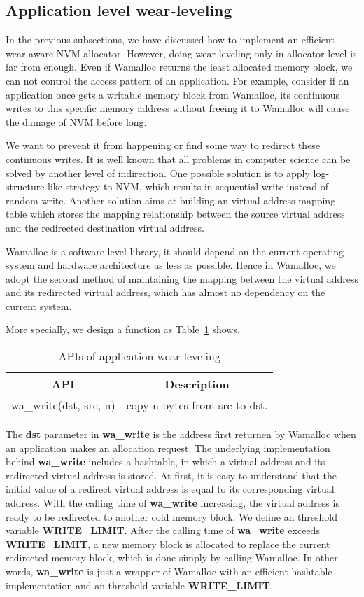 \documentclass{vldb}
\begin{document}
\subsection{Application level wear-leveling}

In the previous subsections, we have discussed how to implement an efficient wear-aware NVM allocator.
However, doing wear-leveling only in allocator level is far from enough.
Even if Wamalloc returns the least allocated memory block, we can not control the access pattern of an application.  
For example, consider if an application once gets a writable memory block from Wamalloc,
its continuous writes to this specific memory address without freeing it to Wamalloc will cause the damage of NVM before long.

We want to prevent it from happening or find some way to redirect these continuous writes.
It is well known that all problems in computer science can be solved by another level of indirection.
One possible solution is to apply log-structure like strategy\cite{rumble2014log} to NVM, 
which results in sequential write instead of random write.
Another solution aims at building an virtual address mapping table which stores the mapping relationship between the source virtual address and the redirected destination virtual address\cite{shao2012ptl}.

Wamalloc is a software level library, it should depend on the current operating system and hardware architecture as less as possible.
Hence in Wamalloc, we adopt the second method of maintaining the mapping between the virtual address and its redirected virtual address,
which has almost no dependency on the current system.

More specially, we design a function as Table~\ref{tab:api} shows.

\begin{table}[h]
\centering
\caption{APIs of application wear-leveling}
\begin{tabular}{|c|c|} \hline
API&Description\\ \hline
    wa\_write(dst, src, n)& copy n bytes from src to dst.\\ \hline
\end{tabular}
\label{tab:api}
\end{table}

The \textbf{dst} parameter in \textbf{wa\_write} is the address first returnen by Wamalloc when an application makes an allocation request.
The underlying implementation behind \textbf{wa\_write} includes a hashtable, in which a virtual address and its redirected virtual address is stored.
At first, it is easy to understand that the initial value of a redirect virtual address is equal to its corresponding virtual address.
With the calling time of \textbf{wa\_write} increasing, the virtual address is ready to be redirected to another cold memory block.
We define an threshold variable \textbf{WRITE\_LIMIT}.
After the calling time of \textbf{wa\_write} exceeds \textbf{WRITE\_LIMIT}, 
a new memory block is allocated to replace the current redirected memory block, which is done simply by calling Wamalloc.
In other words, \textbf{wa\_write} is just a wrapper of Wamalloc with an efficient hashtable implementation and an threshold variable \textbf{WRITE\_LIMIT}.
\end{document}
